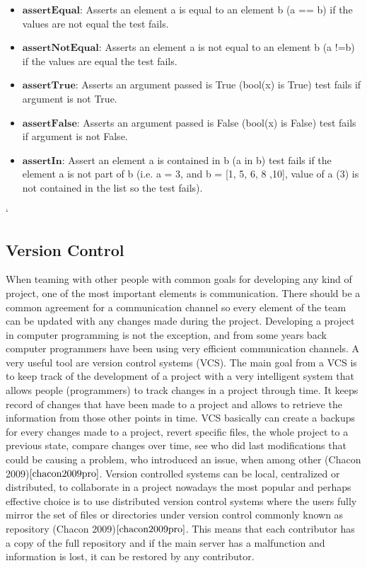 \documentclass{article}
\begin{document}
\begin{itemize}
	\item $\textbf{assertEqual:}$ Asserts an element a is equal to an element  b (a == b) if the values are not equal the test fails.
	\item $\textbf{assertNotEqual:}$ Asserts an element a is not equal to an element b (a !=b) if the values are equal the test fails.
	\item $\textbf{assertTrue:}$ Asserts an argument passed is True (bool(x) is True) test fails if argument is not True. 
	\item $\textbf{assertFalse:}$ Asserts an argument passed is False (bool(x) is False) test fails if argument is not False.
	\item $\textbf{assertIn:}$ Assert an element a is contained in b (a in b) test fails if the element a is not part of b (i.e. a = 3, and b = [1, 5, 6, 8 ,10], value of a (3) is not contained in the list so the test fails).
\end{itemize}

`
\subsection{Version Control}
When teaming with other people with common goals for developing any kind of project, one of the most important elements is communication. There should be a common agreement for a communication channel so every element of the team can be updated with any changes made during the project. 
Developing a project in computer programming is not the exception, and from some years back computer programmers have been using very efficient communication channels. A very useful tool are version control systems (VCS). The main goal from a VCS is to keep track of the development of a project with a very intelligent system that allows people (programmers) to track changes in a project through time. It keeps record of changes that have been made to a project and allows to retrieve the information from those other points in time. VCS basically can create a backups for every changes made to a project, revert specific files, the whole project to a previous state, compare changes over time, see who did last modifications that could be causing a problem, who introduced an issue, when among other (Chacon 2009)$\cite{chacon2009pro}$. Version controlled systems can be local, centralized or distributed, to collaborate in a project nowadays the most popular and perhaps effective choice is to use distributed version control systems where the users fully mirror the set of files or directories under version control commonly known as repository (Chacon 2009)$\cite{chacon2009pro}$. This means that each contributor has a copy of the full repository and if the main server has a malfunction and information is lost, it can be restored by any contributor. 
\end{document}
